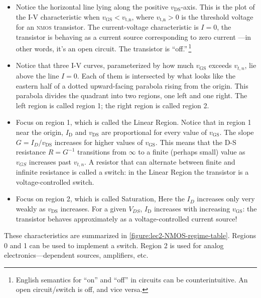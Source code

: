 \begin{itemize}
  \item Notice the horizontal line lying along the positive
  \(v_\text{DS}\)-axis.
  This is the plot of the I-V characteristic when
  \(v_\text{GS} < v_\text{t,n}\), where
  \(v_\text{t,n} > 0\)
  is the threshold voltage for an \textsc{nmos} transistor.
  The current-voltage characteristic is \(I=0\),
  the transistor is behaving as a current source corresponding to zero current%
  ---in other words, it's an open circuit.
  The transistor is ``off.''\,\footnote{English semantics for ``on'' and ``off'' in circuits can be counterintuitive. An open circuit/switch is off, and vice versa.}
  \item
  Notice that three I-V curves, parameterized
  by how much \(v_\text{GS}\) exceeds \(v_{t,n}\),
  lie above the line \(I = 0\).
  Each of them is intersected by what looks like the eastern half of
  a dotted upward-facing parabola rising
  from the origin.
  This parabola divides the quadrant into two regions, one left and one right.
  The left region is called region 1; the right region is called region 2.
  \item
  Focus on region 1, which is called the Linear Region.
  Notice that in region 1 near the origin, \(I_\text{D}\) and \(v_\text{DS}\) are proportional for every value of \(v_\text{GS}\).
  The slope \(G = I_{D} / v_\text{DS}\) increases for higher values of
  \(v_\text{GS}\).
  This means that the D-S resistance \(R = G^{-1}\) transitions from
  \(\infty\) to a finite (perhaps small) value as
  \(v_{GS}\) increases past \(v_{t,n}\).
  A resistor that can alternate between finite and infinite resistance
  is called a switch: in the Linear Region the transistor is a voltage-controlled switch.
  \item
  Focus on region 2, which is called Saturation,
  Here the \(I_{D}\) increases only very weakly
  as \(v_\text{DS}\) increases.%
  For a given \(V_{DS}\),
  \(I_\text{D}\) increases with increasing \(v_\text{GS}\):
  the transistor behaves approximately as a voltage-controlled current source!
\end{itemize}
These characteristics are summarized in \autoref{figure:lec2-NMOS-regime-table}.
Regions 0 and 1 can be used to implement a switch.
Region 2 is used for analog electronics---dependent sources,
  amplifiers, etc.

